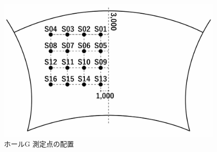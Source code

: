\documentclass[11pt,a4j]{jreport}
\begin{document}
\begin{figure}[H]
\begin{minipage}{0.5\textwidth}
      \includegraphics[width=.8\linewidth]{images/measuredHalls/resized/flat_g.jpg}
      \\ホールG 測定点の配置
    \end{minipage}%
    \begin{minipage}{.5\linewidth} %
        \raggedleft

\end{minipage}
\end{figure}
\end{document}
